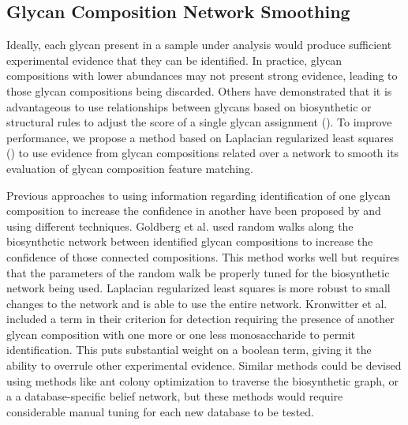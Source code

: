 \subsection{Glycan Composition Network Smoothing}

    Ideally, each glycan present in a sample under analysis would produce sufficient
    experimental evidence that they can be identified. In practice, glycan
    compositions with lower abundances may not present strong evidence, leading
    to those glycan compositions being discarded. Others have demonstrated that
    it is advantageous to use relationships between glycans based on biosynthetic
    or structural rules to adjust the score of a single glycan assignment
    (\citealp{Goldberg2009, Kronewitter2014}). To improve performance, we propose
    a method based on Laplacian regularized least squares (\citealp{Belkin2006})
    to use evidence from glycan compositions related over a network to smooth
    its evaluation of glycan composition feature matching.

    Previous approaches to using information regarding identification of one
    glycan composition to increase the confidence in another have been proposed
    by \citealp{Goldberg2009} and \citealp{Kronewitter2014} using different techniques.
    Goldberg et al. used random walks along the biosynthetic network between identified
    glycan compositions to increase the confidence of those connected compositions. This
    method works well but requires that the parameters of the random walk be properly tuned
    for the biosynthetic network being used. Laplacian regularized least squares is more
    robust to small changes to the network and is able to use the entire network. Kronwitter
    et al. included a term in their criterion for detection requiring the presence of another
    glycan composition with one more or one less monosaccharide to permit identification. This
    puts substantial weight on a boolean term, giving it the ability to overrule other
    experimental evidence. Similar methods could be devised using methods like ant colony
    optimization to traverse the biosynthetic graph, or a a database-specific belief network,
    but these methods would require considerable manual tuning for each new database to be
    tested.

    

    

    

